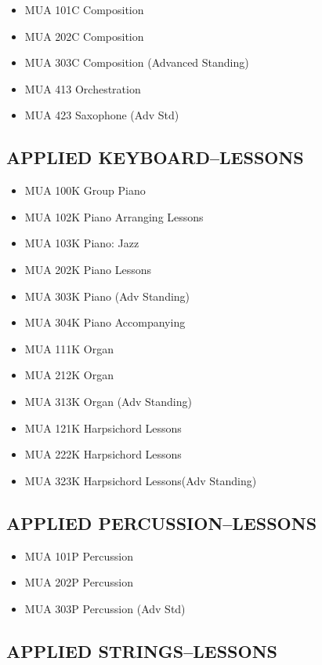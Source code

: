 \documentclass[
  letterpaper,
]{scrbook}
\providecommand{\tightlist}{%
  \setlength{\itemsep}{0pt}\setlength{\parskip}{0pt}}
\begin{document}
\begin{itemize}
\tightlist
\item
  MUA 101C Composition
\item
  MUA 202C Composition
\item
  MUA 303C Composition (Advanced Standing)
\item
  MUA 413 Orchestration
\item
  MUA 423 Saxophone (Adv Std)
\end{itemize}

\subsection{APPLIED KEYBOARD--LESSONS}\label{applied-keyboardlessons}

\begin{itemize}
\tightlist
\item
  MUA 100K Group Piano
\item
  MUA 102K Piano Arranging Lessons
\item
  MUA 103K Piano: Jazz
\item
  MUA 202K Piano Lessons
\item
  MUA 303K Piano (Adv Standing)
\item
  MUA 304K Piano Accompanying
\item
  MUA 111K Organ
\item
  MUA 212K Organ
\item
  MUA 313K Organ (Adv Standing)
\item
  MUA 121K Harpsichord Lessons
\item
  MUA 222K Harpsichord Lessons
\item
  MUA 323K Harpsichord Lessons(Adv Standing)
\end{itemize}

\subsection{APPLIED
PERCUSSION--LESSONS}\label{applied-percussionlessons}

\begin{itemize}
\tightlist
\item
  MUA 101P Percussion
\item
  MUA 202P Percussion
\item
  MUA 303P Percussion (Adv Std)
\end{itemize}

\subsection{APPLIED STRINGS--LESSONS}\label{applied-stringslessons}
\end{document}
